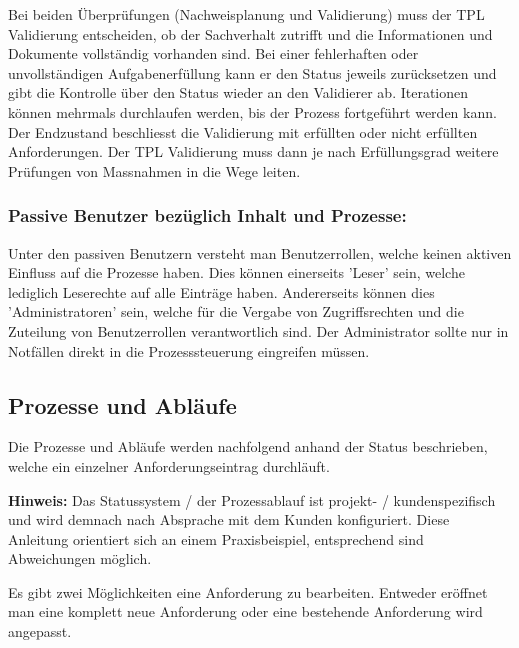 Bei beiden Überprüfungen (Nachweisplanung und Validierung) muss der TPL Validierung entscheiden, ob der Sachverhalt zutrifft und die Informationen und Dokumente vollständig vorhanden sind. Bei einer fehlerhaften oder unvollständigen Aufgabenerfüllung kann er den Status jeweils zurücksetzen und gibt die Kontrolle über den Status wieder an den Validierer ab. Iterationen können mehrmals durchlaufen werden, bis der Prozess fortgeführt werden kann. \\

Der Endzustand beschliesst die Validierung mit erfüllten oder nicht erfüllten Anforderungen. Der TPL Validierung muss dann je nach Erfüllungsgrad weitere Prüfungen von Massnahmen in die Wege leiten.

\subsubsection{Passive Benutzer bezüglich Inhalt und Prozesse:} 

Unter den passiven Benutzern versteht man Benutzerrollen, welche keinen aktiven Einfluss auf die Prozesse haben. Dies können einerseits 'Leser' sein, welche lediglich Leserechte auf alle Einträge haben. Andererseits können dies 'Administratoren' sein, welche für die Vergabe von Zugriffsrechten und die Zuteilung von Benutzerrollen verantwortlich sind. Der Administrator sollte nur in Notfällen direkt in die Prozesssteuerung eingreifen müssen.

\subsection{Prozesse und Abläufe}

Die Prozesse und Abläufe werden nachfolgend anhand der Status beschrieben, welche ein einzelner Anforderungseintrag durchläuft. 

\vspace{\baselineskip}

\textbf{Hinweis:} Das Statussystem / der Prozessablauf ist projekt- / kundenspezifisch und wird demnach nach Absprache mit dem Kunden konfiguriert. Diese Anleitung orientiert sich an einem Praxisbeispiel, entsprechend sind Abweichungen möglich.

\vspace{\baselineskip}

Es gibt zwei Möglichkeiten eine Anforderung zu bearbeiten. Entweder eröffnet man eine komplett neue Anforderung oder eine bestehende Anforderung wird angepasst.

